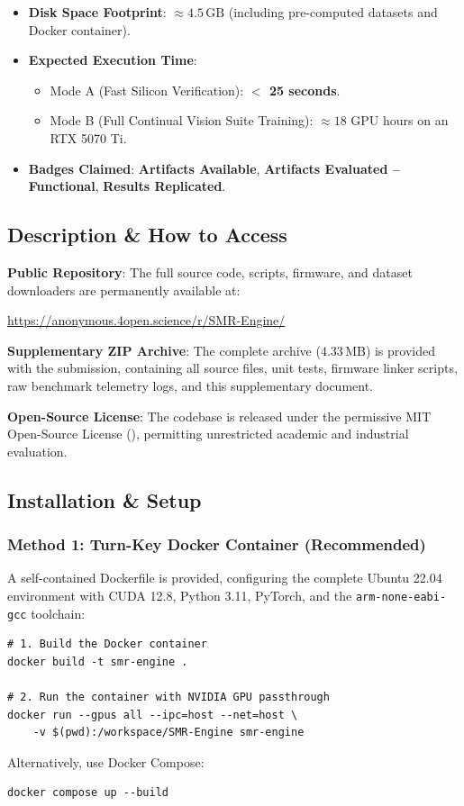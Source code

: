 \documentclass{article}
\begin{document}
\begin{itemize}
    \item \textbf{Disk Space Footprint}: $\approx 4.5\,\text{GB}$ (including pre-computed datasets and Docker container).
    \item \textbf{Expected Execution Time}:
    \begin{itemize}\footnotesize
        \item Mode A (Fast Silicon Verification): \textbf{$<$ 25 seconds}.
        \item Mode B (Full Continual Vision Suite Training): $\approx 18$ GPU hours on an RTX 5070 Ti.
    \end{itemize}
    \item \textbf{Badges Claimed}: \textbf{Artifacts Available}, \textbf{Artifacts Evaluated -- Functional}, \textbf{Results Replicated}.
\end{itemize}

\subsection{Description \& How to Access}
\noindent\textbf{Public Repository}: The full source code, scripts, firmware, and dataset downloaders are permanently available at:
\begin{center}
\url{https://anonymous.4open.science/r/SMR-Engine/}
\end{center}
\noindent\textbf{Supplementary ZIP Archive}: The complete archive  ($4.33\,\text{MB}$) is provided with the submission, containing all source files, unit tests, firmware linker scripts, raw benchmark telemetry logs, and this supplementary document.

\noindent\textbf{Open-Source License}: The codebase is released under the permissive MIT Open-Source License (), permitting unrestricted academic and industrial evaluation.

\subsection{Installation \& Setup}

\subsubsection{Method 1: Turn-Key Docker Container (Recommended)}
A self-contained Dockerfile is provided, configuring the complete Ubuntu 22.04 environment with CUDA 12.8, Python 3.11, PyTorch, and the \texttt{arm-none-eabi-gcc} toolchain:
\begin{verbatim}
# 1. Build the Docker container
docker build -t smr-engine .

# 2. Run the container with NVIDIA GPU passthrough
docker run --gpus all --ipc=host --net=host \
    -v $(pwd):/workspace/SMR-Engine smr-engine
\end{verbatim}
Alternatively, use Docker Compose:
\begin{verbatim}
docker compose up --build
\end{verbatim}
\end{document}
